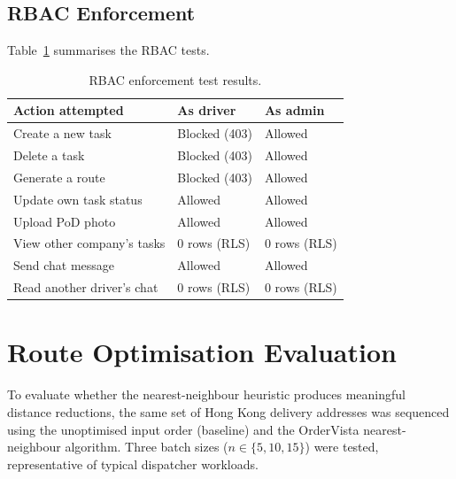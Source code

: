 \subsection{RBAC Enforcement}
\label{sec:rbac-test}

Table~\ref{tab:rbac-test} summarises the RBAC tests.

\begin{table}[H]
  \centering
  \caption{RBAC enforcement test results.}
  \label{tab:rbac-test}
  \small
  \begin{tabularx}{\textwidth}{X l l}
    \toprule
    \textbf{Action attempted} & \textbf{As driver} & \textbf{As admin} \\
    \midrule
    Create a new task              & Blocked (403) & Allowed \\
    Delete a task                  & Blocked (403) & Allowed \\
    Generate a route               & Blocked (403) & Allowed \\
    Update own task status         & Allowed       & Allowed \\
    Upload PoD photo               & Allowed       & Allowed \\
    View other company's tasks     & 0 rows (RLS)  & 0 rows (RLS) \\
    Send chat message              & Allowed       & Allowed \\
    Read another driver's chat     & 0 rows (RLS)  & 0 rows (RLS) \\
    \bottomrule
  \end{tabularx}
\end{table}

\section{Route Optimisation Evaluation}
\label{sec:route-eval}

To evaluate whether the nearest-neighbour heuristic produces meaningful
distance reductions, the same set of Hong Kong delivery addresses was
sequenced using the unoptimised input order (baseline) and the OrderVista
nearest-neighbour algorithm.  Three batch sizes ($n \in \{5, 10, 15\}$) were
tested, representative of typical dispatcher workloads.

